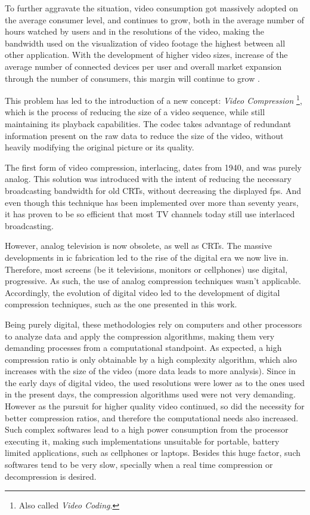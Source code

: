 To further aggravate the situation, video consumption got massively adopted on the average consumer level, and continues to grow, both in the average number of hours watched by users and in the resolutions of the video, making the bandwidth used on the visualization of video footage the highest between all other application. With the development of higher video sizes, increase of the average number of connected devices per user and overall market expansion through the number of consumers, this margin will continue to grow \cite[Trends~1~\&~4]{CiscoVisualNetworking}.

This problem has led to the introduction of a new concept: \emph{Video Compression} \footnote{Also called \textit{Video Coding}.}, which is the process of reducing the size of a video sequence, while still maintaining its playback capabilities. The \Gls{codec} takes advantage of redundant information present on the raw data to reduce the size of the video, without heavily modifying the original picture or its quality. 

The first form of video compression, \gls{interlacing}, dates from 1940, and was purely analog. This solution was introduced with the intent of reducing the necessary broadcasting bandwidth for old CRTs, without decreasing the displayed fps. And even though this technique has been implemented over more than seventy years, it has proven to be so efficient that most TV channels today still use interlaced broadcasting.

However, analog television is now obsolete, as well as CRTs. The massive developments in \Gls{ic} fabrication led to the rise of the digital era we now live in. Therefore, most screens (be it televisions, monitors or cellphones) use digital, \gls{progressive}. As such, the use of analog compression techniques wasn't applicable. Accordingly, the evolution of digital video led to the development of digital compression techniques, such as the one presented in this work.

Being purely digital, these methodologies rely on computers and other processors to analyze data and apply the compression algorithms, making them very demanding processes from a computational standpoint. As expected, a high compression ratio is only obtainable by a high complexity algorithm, which also increases with the size of the video (more data leads to more analysis). Since in the early days of digital video, the used resolutions were lower as to the ones used in the present days, the compression algorithms used were not very demanding. However as the pursuit for higher quality video continued, so did the necessity for better compression ratios, and therefore the computational needs also increased. Such complex softwares lead to a high power consumption from the processor executing it, making such implementations unsuitable for portable, battery limited applications, such as cellphones or laptops. Besides this huge factor, such softwares tend to be very slow, specially when a real time compression or decompression is desired.

